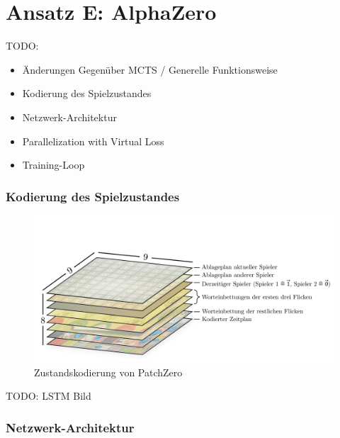 \pagebreak

\section{Ansatz E: AlphaZero}
\label{section:erstellung-ansatz-d}

TODO:

\begin{itemize}
    \item Änderungen Gegenüber MCTS / Generelle Funktionsweise
    \item Kodierung des Spielzustandes
    \item Netzwerk-Architektur
    \item Parallelization with Virtual Loss
    \item Training-Loop
\end{itemize}

\subsubsection*{Kodierung des Spielzustandes}

\begin{figure}[!ht]
    \centering
    \vspace*{-1.75cm}
    \includegraphics[width=\textwidth]{res/pictures/patch-zero-state.pdf}
    \caption{Zustandskodierung von PatchZero}
    \label{fig:patch-zero-state}
\end{figure}

TODO: LSTM Bild

\pagebreak

\subsubsection*{Netzwerk-Architektur}

\cite{2018.Lc0AlphaZero}
\cite{2019.SqueezeandExcitation}
\cite{2020.Lc0NetworkTopology}


